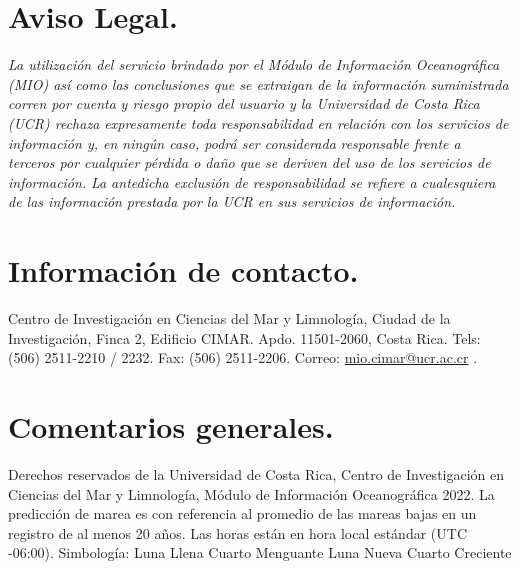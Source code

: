 \documentclass{article}%
\begin{document}
%
\normalsize%
\thispagestyle{empty}%
\section*{Aviso Legal.}%
\label{sec:AvisoLegal.}%
\textit{La utilización del servicio brindado por el Módulo de Información Oceanográfica }%
\textit{(MIO) así como las conclusiones que se extraigan de la información suministrada corren por cuenta }%
\textit{y riesgo propio del usuario y la Universidad de Costa Rica (UCR) rechaza expresamente toda }%
\textit{responsabilidad en relación con los servicios de información y, en ningún caso, podrá ser considerada }%
\textit{responsable frente a terceros por cualquier pérdida o daño que se deriven del uso de los servicios de información. }%
\textit{La antedicha exclusión de responsabilidad se refiere a cualesquiera de las información }%
\textit{prestada por la UCR en sus servicios de información.\newline%
\newline%
}

%
\section*{Información de contacto.}%
\label{sec:Informacindecontacto.}%
Centro de Investigación en Ciencias del Mar y Limnología, Ciudad de la Investigación, Finca 2, %
Edificio CIMAR.\newline%
\newline%
%
Apdo. 11501{-}2060, Costa Rica.\newline%
\newline%
%
Tels: (506) 2511{-}2210 / 2232. \newline%
\newline%
%
Fax: (506) 2511{-}2206.\newline%
\newline%
%
Correo: %
\href{mailto:mio.cimar@ucr.ac.cr}{mio.cimar@ucr.ac.cr}%
.\newline%
\newline%

%
\section*{Comentarios generales.}%
\label{sec:Comentariosgenerales.}%
\textsuperscript%
\textcopyright%
Derechos reservados de la Universidad de Costa Rica,  %
Centro de Investigación en Ciencias del Mar y Limnología, %
Módulo de Información Oceanográfica 2022.\newline%
\newline%
%
La predicción de marea es con referencia al promedio de las mareas bajas en un registro de al menos 20 años.\newline%
\newline%
%
Las horas están en hora local estándar (UTC {-}06:00).\newline%
\newline%
%
Simbología: %
\fullmoon%
 Luna Llena %
\leftmoon%
 Cuarto Menguante %
\newmoon%
 Luna Nueva %
\rightmoon%
 Cuarto Creciente%
\vfill%
\end{document}
